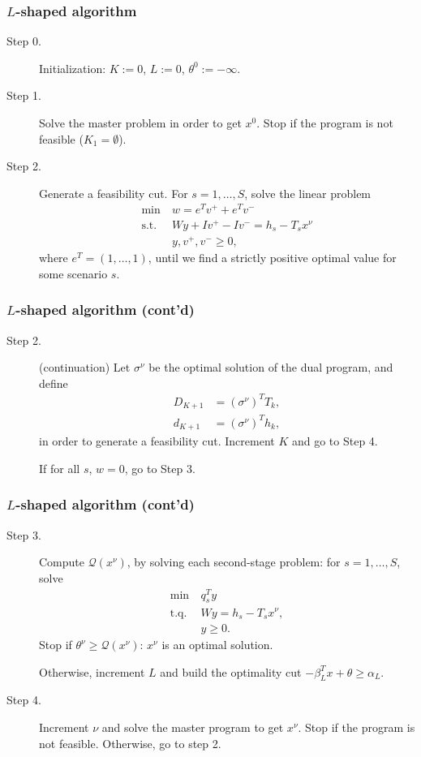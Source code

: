 \documentclass{beamer}
\begin{document}
\begin{frame}
\frametitle{$L$-shaped algorithm}
	
\begin{description}
\item[Step 0.]  {\red Initialization}:
$K := 0$, $L:= 0$, $\theta^{0} := -\infty$.
\item[Step 1.] {\red Solve the master problem} in order to get $x^0$.
Stop if the program is not feasible ($K_1 = \emptyset$).
\item[Step 2.]
Generate a {\red feasibility cut}.
For $s = 1,\ldots,S$, solve the linear problem
\begin{align*}
\min\ & w = e^Tv^+ + e^Tv^- \\
\mbox{s.t. } & Wy + Iv^+ - Iv^- = h_s - T_sx^{\nu} \\
& y, v^+, v^- \geq 0,
\end{align*}
where $e^T = (1,\ldots,1)$, until we find a strictly positive optimal value for some scenario $s$.
\end{description}
	
\end{frame}

\begin{frame}
\frametitle{$L$-shaped algorithm (cont'd)}
	
\begin{description}
\item[Step 2.] (continuation)
Let $\sigma^{\nu}$ be the optimal solution of the dual program, and define
\begin{align*}
D_{K+1} &= (\sigma^{\nu})^TT_k, \\
d_{K+1} &= (\sigma^{\nu})^Th_k,
\end{align*}
in order to generate a feasibility cut.
Increment $K$ and go to Step 4.

\mbox{}
		
If for all $s$, $w = 0$, go to Step 3.
\end{description}
	
\end{frame}

\begin{frame}
\frametitle{$L$-shaped algorithm (cont'd)}
	
\begin{description}
\item[Step 3.]
Compute $\mathcal{Q}(x^{\nu})$, by solving each second-stage problem: for $s = 1,\ldots,S$, solve
\begin{align*}
\min\ & q^T_sy \\
\mbox{t.q. } & Wy = h_s-T_sx^{\nu},\\
& y \geq 0.
\end{align*}
Stop if $\theta^{\nu} \geq \mathcal{Q}(x^{\nu})$: $x^{\nu}$ is an optimal solution.
		
Otherwise, increment $L$ and build the optimality cut $-\beta_L^T
x + \theta \geq \alpha_L$.
\item[Step 4.]
Increment $\nu$ and solve the master program to get $x^{\nu}$.
Stop if the program is not feasible. Otherwise, go to step 2.
\end{description}
	
\end{frame}
\end{document}
